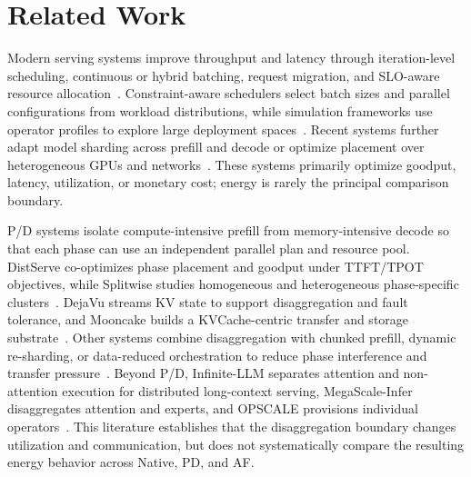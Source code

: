 \section{Related Work}

Modern serving systems improve throughput and latency through iteration-level scheduling, continuous or hybrid batching, request migration, and SLO-aware resource allocation~\cite{yu2022orca,kwon2023vllm,agrawal2024sarathi,sun2024llumnix,duan2024muxserve,hong2025sola}. Constraint-aware schedulers select batch sizes and parallel configurations from workload distributions, while simulation frameworks use operator profiles to explore large deployment spaces~\cite{agrawal2024vidur}. Recent systems further adapt model sharding across prefill and decode or optimize placement over heterogeneous GPUs and networks~\cite{su2025seesaw,jiang2025thunderserve,mei2025helix}. These systems primarily optimize goodput, latency, utilization, or monetary cost; energy is rarely the principal comparison boundary.

P/D systems isolate compute-intensive prefill from memory-intensive decode so that each phase can use an independent parallel plan and resource pool. DistServe co-optimizes phase placement and goodput under TTFT/TPOT objectives, while Splitwise studies homogeneous and heterogeneous phase-specific clusters~\cite{zhong2024distserve,patel2024splitwise}. DejaVu streams KV state to support disaggregation and fault tolerance, and Mooncake builds a KVCache-centric transfer and storage substrate~\cite{strati2024dejavu,qin2024mooncake}. Other systems combine disaggregation with chunked prefill, dynamic re-sharding, or data-reduced orchestration to reduce phase interference and transfer pressure~\cite{su2025seesaw}. Beyond P/D, Infinite-LLM separates attention and non-attention execution for distributed long-context serving, MegaScale-Infer disaggregates attention and experts, and OPSCALE provisions individual operators~\cite{lin2024infinitellm,zhu2025megascale,cui2026opscale}. This literature establishes that the disaggregation boundary changes utilization and communication, but does not systematically compare the resulting energy behavior across Native, PD, and AF.

